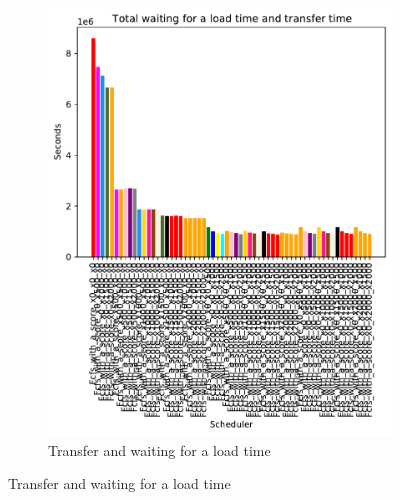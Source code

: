 \documentclass[a4paper]{article}
\begin{document}
\begin{figure}[H]\centering
\begin{subfigure}[b]{0.4\linewidth}\centering\includegraphics[width=1\linewidth]{MBSS/plot/FCFS_Score_2022-01-24->2022-01-24_Total_waiting_for_a_load_time_and_transfer_time_450_128_32_256_4_1024.pdf}\caption{Transfer and waiting for a load time}\label{1}\end{subfigure}

\end{figure}
\end{document}
